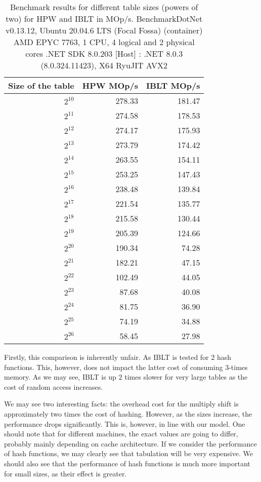 \begin{table}[h!]
\centering
\begin{tabular}{r r r}
\toprule
Size of the table& \multicolumn{1}{c}{HPW MOp/s} & \multicolumn{1}{c}{IBLT MOp/s} \\
\midrule
$2^{10}$    & 278.33 & 181.47 \\
$2^{11}$    & 274.58 & 178.53 \\
$2^{12}$    & 274.17 & 175.93 \\
$2^{13}$    & 273.79 & 174.42 \\
$2^{14}$    & 263.55 & 154.11 \\
$2^{15}$    & 253.25 & 147.43 \\
$2^{16}$    & 238.48 & 139.84 \\
$2^{17}$    & 221.54 & 135.77 \\
$2^{18}$    & 215.58 & 130.44 \\
$2^{19}$    & 205.39 & 124.66 \\
$2^{20}$    & 190.34 & 74.28 \\
$2^{21}$    & 182.21 & 47.15 \\
$2^{22}$    & 102.49 & 44.05 \\
$2^{23}$    & 87.68 & 40.08 \\
$2^{24}$    & 81.75 & 36.90 \\
$2^{25}$    & 74.19 & 34.88 \\
$2^{26}$    & 58.45 & 27.98 \\
\bottomrule
\end{tabular}
\caption{Benchmark results for different table sizes (powers of two) for HPW and IBLT in MOp/s. 
BenchmarkDotNet v0.13.12, Ubuntu 20.04.6 LTS (Focal Fossa) (container)
AMD EPYC 7763, 1 CPU, 4 logical and 2 physical cores
.NET SDK 8.0.203
  [Host]     : .NET 8.0.3 (8.0.324.11423), X64 RyuJIT AVX2}
\label{table:benchmark_results}
\end{table}

Firstly, this comparison is inherently unfair. As IBLT is tested for 2 hash functions. This, however, does not impact the latter cost of consuming $3$-times memory. As we may see, IBLT is up $2$ times slower for very large tables as the cost of random access increases.

We may see two interesting facts: the overhead cost for the multiply shift is approximately two times the cost of hashing. However, as the sizes increase, the performance drops significantly. This is, however, in line with our model. One should note that for different machines, the exact values are going to differ, probably mainly depending on cache architecture. 
If we consider the performance of hash functions, we may clearly see that tabulation will be very expensive. We should also see that the performance of hash functions is much more important for small sizes, as their effect is greater.



